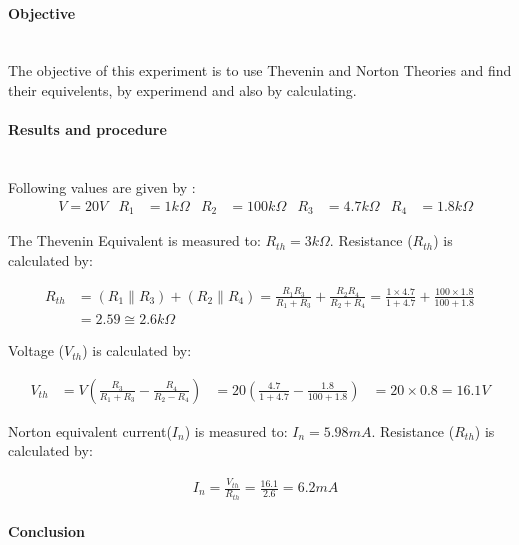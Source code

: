 \paragraph*{Objective} \hfill \\
The objective of this experiment is to use Thevenin and Norton Theories and find their equivelents, by experimend and also by calculating.
\paragraph*{Results and procedure} \hfill\\
Following values are given by : \\
\begin{align*}
&V=20V	&	R_{1}&= 1k\Omega	&	R_{2}&= 100k\Omega	&	R_{3}&= 4.7k\Omega	&	R_{4}&= 1.8k\Omega
\end{align*}

\begin{flushleft}
The Thevenin Equivalent is measured to: $ R_{th}= 3k\Omega $. Resistance ($ R_{th} $) is calculated by:
\end{flushleft}

\begin{align*}
R_{th}&= (R_{1} \parallel R_{3})+(R_{2} \parallel R_{4}) = \frac{R_{1}R_{3}}{R_{1}+R_{3}}+ \frac{R_{2}R_{4}}{R_{2}+R_{4}} = \frac{1 \times 4.7}{1+4.7} + \frac{100 \times 1.8}{100+ 1.8} \\
&=2.59 \cong 2.6k\Omega
\end{align*}

\begin{flushleft}
Voltage ($ V_{th} $) is calculated by:
\end{flushleft}
\begin{align*}
V_{th}&=V(\frac{R_{3}}{R_{1}+R_{3}}-\frac{R_{4}}{R_{2}-R_{4}})
&=20(\frac{4.7}{1+4.7}-\frac{1.8}{100+1.8})	
&=20 \times 0.8 =16.1V
\end{align*}

\begin{flushleft}
Norton equivalent current($ I_{n} $) is measured to: $ I_{n}= 5.98mA $. Resistance ($ R_{th} $) is calculated by:
\end{flushleft}

\begin{align*}
&I_{n}= \frac{V_{th}}{R_{th}}= \frac{16.1}{2.6}= 6.2mA
\end{align*}
\paragraph*{Conclusion} \hfill \\